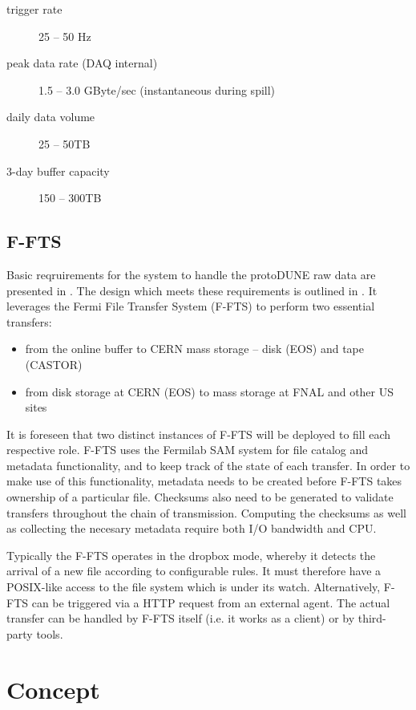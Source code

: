 \documentclass[pdftex,12pt,letter]{article}
\newcommand{\pd}{protoDUNE\xspace}
\begin{document}
\begin{description}
\item[trigger rate] 25 -- 50 Hz
\item[peak data rate (DAQ internal)] 1.5 -- 3.0 GByte/sec (instantaneous during spill)
\item[daily data volume] 25 -- 50TB
\item[3-day buffer capacity] 150 -- 300TB
\end{description}

\subsection{F-FTS}
Basic reqruirements for the system to handle the \pd raw data are presented in \cite{docdb1209}.
The design which meets these requirements is outlined in \cite{docdb1212}. It leverages the
Fermi File Transfer System (F-FTS) to perform two essential transfers:
\begin{itemize}
\item from the online buffer to CERN mass storage -- disk (EOS) and tape (CASTOR)
\item from disk storage at CERN (EOS) to mass storage at FNAL and other US sites
\end{itemize}

\noindent It is foreseen that two distinct instances of F-FTS will be deployed to fill each
respective role. F-FTS uses the Fermilab SAM system for file catalog and metadata functionality,
and to keep track of the state of each transfer. In order to make use of this functionality, metadata
needs to be created before F-FTS takes ownership of a particular file. Checksums also need to be
generated to validate transfers throughout the chain of transmission. Computing the checksums
as well as collecting the necesary metadata require both I/O bandwidth and CPU.

Typically the F-FTS operates in the dropbox mode, whereby it detects the arrival of a new file
according to configurable rules. It must therefore have a POSIX-like access to the file
system which is under its watch. Alternatively, F-FTS can be triggered via a HTTP request
from an external agent. The actual transfer can be handled by F-FTS itself (i.e. it works
as a client) or by third-party tools.



\section{Concept}
\end{document}
